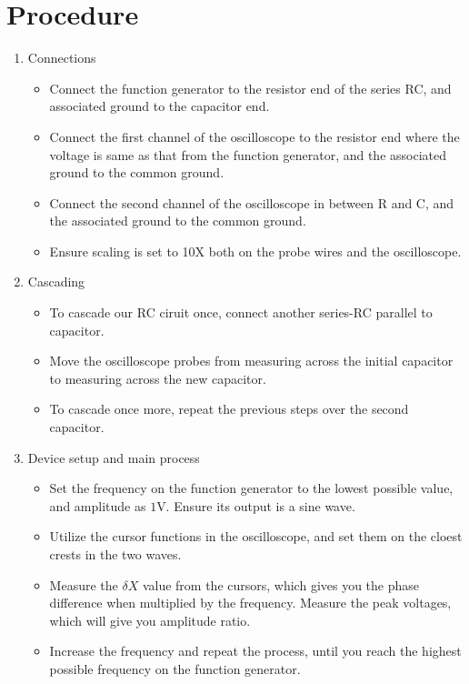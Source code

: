 \documentclass[a4paper,12pt]{article}
\begin{document}
\section{Procedure}
\begin{enumerate}
  \item Connections
    \begin{itemize}
      \item Connect the function generator to the resistor end of the series RC, and associated ground to the capacitor end.
      \item Connect the first channel of the oscilloscope to the resistor end where the voltage is same as that from the function generator, and the associated ground to the common ground.
      \item Connect the second channel of the oscilloscope in between R and C, and the associated ground to the common ground.
      \item Ensure scaling is set to 10X both on the probe wires and the oscilloscope.
    \end{itemize}
  \item Cascading
    \begin{itemize}
      \item To cascade our RC ciruit once, connect another series-RC parallel to capacitor. 
      \item Move the oscilloscope probes from measuring across the initial capacitor to measuring across the new capacitor. 
      \item To cascade once more, repeat the previous steps over the second capacitor. 
    \end{itemize}
  \item Device setup and main process
    \begin{itemize}
      \item Set the frequency on the function generator to the lowest possible value, and amplitude as $1$V. Ensure its output is a sine wave.
      \item Utilize the cursor functions in the oscilloscope, and set them on the cloest crests in the two waves. 
      \item Measure the $\delta X$ value from the cursors, which gives you the phase difference when multiplied by the frequency. Measure the peak voltages, which will give you amplitude ratio. 
      \item Increase the frequency and repeat the process, until you reach the highest possible frequency on the function generator. 
    \end{itemize}

\end{enumerate}
\end{document}
